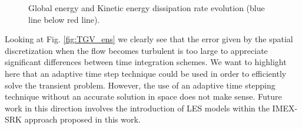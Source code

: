 \begin{figure}[h!]
  \centering
  \caption{Global energy and Kinetic energy dissipation rate evolution (blue line below red line).}
  \label{fig:TGV_ene_ens}
\end{figure}

Looking at Fig. \ref{fig:TGV_ens} we clearly see that the error given by the spatial discretization when the flow becomes turbulent is too large to appreciate significant differences between time integration schemes. We want to highlight here that an adaptive time step technique could be used in order to efficiently solve the transient problem. However, the use of an adaptive time stepping technique without an accurate solution in space does not make sense. Future work in this direction involves the introduction of LES models within the IMEX-SRK approach proposed in this work.


